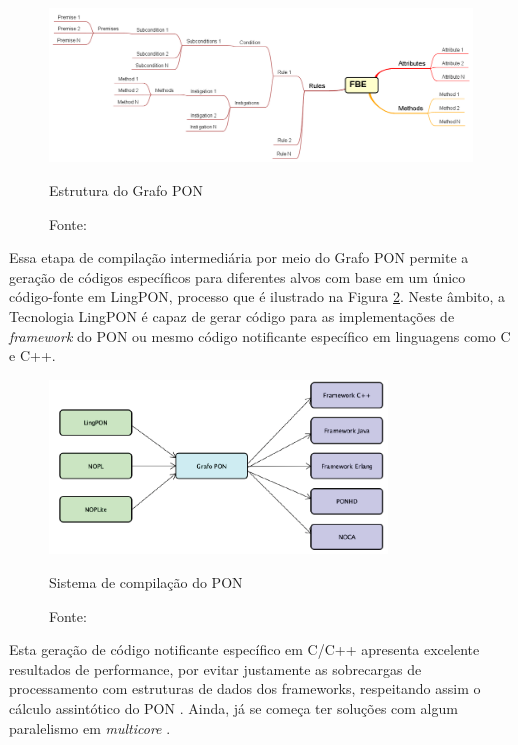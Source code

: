 \begin{figure}[!htb]
  \centering
  \includegraphics[width=\textwidth]{../figures/grafo_pon_negrini.png}
  \smallskip
  \caption{Estrutura do Grafo PON}
  \caption*{Fonte: }
  \label{fig:grafo_pon}
\end{figure}

Essa etapa de compilação intermediária por meio do Grafo PON permite  a geração
de códigos específicos para diferentes alvos com base em um único código-fonte
em LingPON, processo que é ilustrado na Figura \ref{fig:sistema_compilacao}.
Neste âmbito, a Tecnologia LingPON é capaz de gerar código para as
implementações de \textit{framework} do PON ou mesmo código notificante
específico em linguagens como C e C++. 

\begin{figure}[!htb]
  \centering
  \includegraphics[width=0.8\textwidth]{../figures/sistema_compilacao.png}
  \smallskip
  \caption{Sistema de compilação do PON}
  \caption*{Fonte: }
  \label{fig:sistema_compilacao}
\end{figure}

Esta geração de código notificante específico em C/C++ apresenta excelente
resultados de performance, por evitar justamente as sobrecargas de processamento
com estruturas de dados dos frameworks, respeitando assim o cálculo assintótico
do PON \cite{ronszcka_2017,doc_ronszcka_2019,oshiro_2021}. Ainda, já se começa
ter soluções com algum paralelismo em \textit{multicore}
\cite{doc_ronszcka_2019,martini_2021}.

